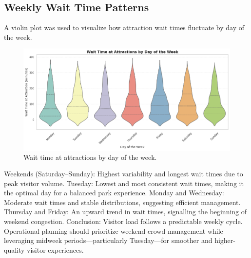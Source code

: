 \documentclass[12pt]{article}
\begin{document}
\subsection{Weekly Wait Time Patterns}
A violin plot was used to visualize how attraction wait times fluctuate by day of the week.

\begin{figure}[H]
    \centering
    \includegraphics[width=1\textwidth]{wait_time_by_day.png}
    \caption{Wait time at attractions by day of the week.}
    \label{fig:wait-time-by-day}
\end{figure}

Weekends (Saturday–Sunday):
Highest variability and longest wait times due to peak visitor volume.
Tuesday:
Lowest and most consistent wait times, making it the optimal day for a balanced park experience.
Monday and Wednesday:
Moderate wait times and stable distributions, suggesting efficient management.
Thursday and Friday:
An upward trend in wait times, signalling the beginning of weekend congestion.
Conclusion:
Visitor load follows a predictable weekly cycle. Operational planning should prioritize weekend crowd management while leveraging midweek periods—particularly Tuesday—for smoother and higher-quality visitor experiences.
\end{document}
